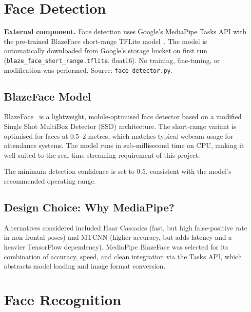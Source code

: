 \documentclass[11pt,a4paper]{article}
\begin{document}
\section{Face Detection}
\label{sec:detection}

\begin{externalbox}
  \textbf{External component.}
  Face detection uses Google's MediaPipe Tasks API with the pre-trained
  BlazeFace short-range TFLite model~\cite{bazarevsky2019blazeface}.
  The model is automatically downloaded from Google's storage bucket on first run
  (\texttt{blaze\_face\_short\_range.tflite}, float16).
  No training, fine-tuning, or modification was performed.
  Source: \texttt{face\_detector.py}.
\end{externalbox}

\subsection{BlazeFace Model}

BlazeFace~\cite{bazarevsky2019blazeface} is a lightweight, mobile-optimised face
detector based on a modified Single Shot MultiBox Detector (SSD) architecture.
The short-range variant is optimised for faces at 0.5--2 metres, which matches
typical webcam usage for attendance systems.
The model runs in sub-millisecond time on CPU, making it well suited to the
real-time streaming requirement of this project.

The minimum detection confidence is set to $0.5$, consistent with the model's
recommended operating range.

\subsection{Design Choice: Why MediaPipe?}

Alternatives considered included Haar Cascades (fast, but high false-positive rate
in non-frontal poses) and MTCNN (higher accuracy, but adds latency and a heavier
TensorFlow dependency).
MediaPipe BlazeFace was selected for its combination of accuracy, speed, and
clean integration via the Tasks API, which abstracts model loading and image
format conversion.

\section{Face Recognition}
\label{sec:recognition}
\end{document}

